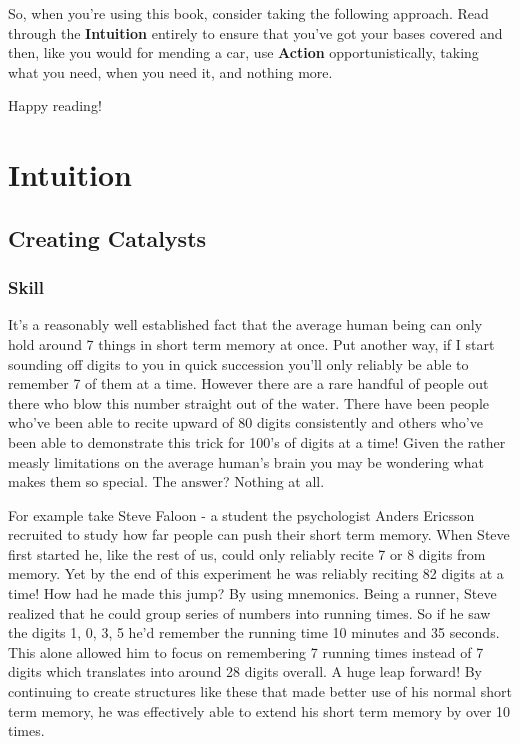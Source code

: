\documentclass[11pt,a5paper]{book}
\begin{document}
So, when you're using this book, consider taking the following approach. Read through the \textbf{Intuition} entirely to ensure that you've got your bases covered and then, like you would for mending a car, use \textbf{Action} opportunistically, taking what you need, when you need it, and nothing more. 
\newline

Happy reading!


\part{Intuition}
\chapter{Creating Catalysts}
\section{Skill}
It's a reasonably well established fact that the average human being can only hold around 7 things in short term memory at once. Put another way, if I start sounding off digits to you in quick succession you'll only reliably be able to remember 7 of them at a time. However there are a rare handful of people out there who blow this number straight out of the water. There have been people who've been able to recite upward of 80 digits consistently and others who've been able to demonstrate this trick for 100's of digits at a time! Given the rather measly limitations on the average human's brain you may be wondering what makes them so special. The answer? Nothing at all.
\newline

For example take Steve Faloon - a student the psychologist Anders Ericsson recruited to study how far people can push their short term memory. When Steve first started he, like the rest of us, could only reliably recite 7 or 8 digits from memory. Yet by the end of this experiment he was reliably reciting 82 digits at a time! How had he made this jump? By using mnemonics. Being a runner, Steve realized that he could group series of numbers into running times. So if he saw the digits 1, 0, 3, 5 he'd remember the running time 10 minutes and 35 seconds. This alone allowed him to focus on remembering 7 running times instead of 7 digits which translates into around 28 digits overall. A huge leap forward! By continuing to create structures like these that made better use of his normal short term memory, he was effectively able to extend his short term memory by over 10 times. 
\newline
\end{document}
